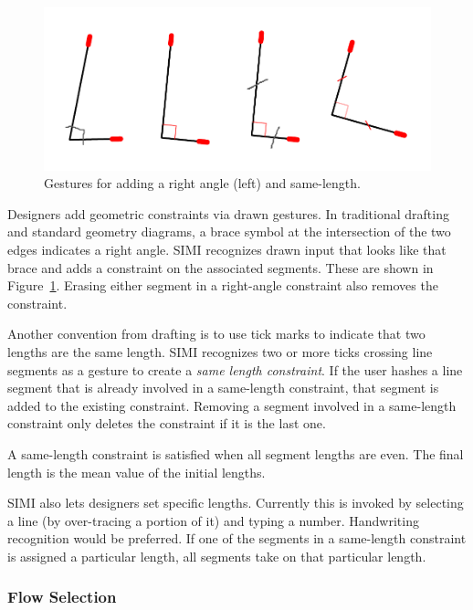 \documentclass{article}
\begin{document}
\begin{figure}[h]
  \centering
  \includegraphics[width=0.9\linewidth]{img/constraints-all.pdf}
  \caption{Gestures for adding a right angle (left) and same-length.}
  \label{fig:constraints}
\end{figure}

Designers add geometric constraints via drawn gestures. In traditional
drafting and standard geometry diagrams, a brace symbol at the
intersection of the two edges indicates a right angle. SIMI recognizes
drawn input that looks like that brace and adds a constraint on the
associated segments. These are shown in
Figure~\ref{fig:constraints}. Erasing either segment in a right-angle
constraint also removes the constraint.

Another convention from drafting is to use tick marks to indicate that
two lengths are the same length. SIMI recognizes two or more ticks
crossing line segments as a gesture to create a \textit{same length
  constraint}. If the user hashes a line segment that is already
involved in a same-length constraint, that segment is added to the
existing constraint. Removing a segment involved in a same-length
constraint only deletes the constraint if it is the last one.

A same-length constraint is satisfied when all segment lengths are
even. The final length is the mean value of the initial lengths.

SIMI also lets designers set specific lengths. Currently this is
invoked by selecting a line (by over-tracing a portion of it) and
typing a number. Handwriting recognition would be preferred. If one of
the segments in a same-length constraint is assigned a particular
length, all segments take on that particular length.

\subsubsection{Flow Selection}
\end{document}
